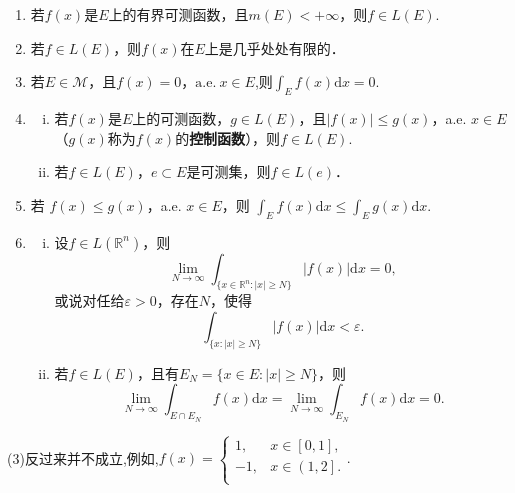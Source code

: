 \documentclass[../../main.tex]{subfiles}%
\begin{document}
\begin{theorem}[积分的基本性质]\label{theorem:积分的基本性质}
\begin{enumerate}[(1)]
\item  若\(f(x)\)是\(E\)上的有界可测函数，且\(m(E) < +\infty\)，则$f \in L(E).$

\item  若\(f \in L(E)\)，则\(f(x)\)在\(E\)上是几乎处处有限的．

\item  若\(E \in \mathscr{M}\)，且\(f(x) = 0\)，\(\text{a.e.}\ x \in E\),则$\int_E f(x) \mathrm{d}x = 0.$

\item \begin{enumerate}[(i)]
\item 若\(f(x)\)是\(E\)上的可测函数，\(g \in L(E)\)，且\(|f(x)| \leqslant g(x)\)，a.e. \(x \in E\)（\(g(x)\)称为\(f(x)\)的\textbf{控制函数}），则\(f \in L(E)\).

\item 若\(f \in L(E)\)，\(e \subset E\)是可测集，则\(f \in L(e)\)．
\end{enumerate}

\item 若 \( f(x) \leqslant g(x) \)，a.e. \( x \in E \)，则 \( \int_E f(x)\mathrm{d}x \leqslant \int_E g(x)\mathrm{d}x \).

\item \begin{enumerate}[(i)]
\item 设\(f \in L(\mathbb{R}^n)\)，则
\[
\lim_{N \to \infty} \int_{\{x \in \mathbb{R}^n: |x| \geqslant N\}} |f(x)| \mathrm{d}x = 0,
\]
或说对任给\(\varepsilon > 0\)，存在\(N\)，使得
\[
\int_{\{x: |x| \geqslant N\}} |f(x)| \mathrm{d}x < \varepsilon.
\]

\item 若\(f \in L(E)\)，且有\(E_N = \{x \in E: |x| \geqslant N\}\)，则
\[
\lim_{N \to \infty} \int_{E \cap E_N} f(x) \mathrm{d}x =\lim_{N \to \infty} \int_{E_N} f(x) \mathrm{d}x = 0.
\]
\end{enumerate}
\end{enumerate}
\end{theorem}
\begin{remark}
(3)反过来并不成立,例如,$f\left( x \right) =\begin{cases}
1,&x\in \left[ 0,1 \right] ,\\
-1,&x\in \left( 1,2 \right] .\\
\end{cases}.$
\end{remark}
\end{document}
